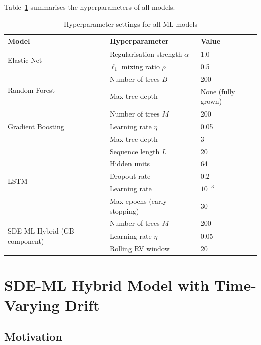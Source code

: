 \documentclass[12pt, a4paper, oneside]{report}
\theoremstyle{plain}
\theoremstyle{definition}
\theoremstyle{remark}
\begin{document}
Table~\ref{tab:hyperparams} summarises the hyperparameters of all models.

\begin{table}[H]
\begin{singlespace}
\fontsize{10}{11}\selectfont
\caption{Hyperparameter settings for all ML models}
\label{tab:hyperparams}
\begin{tabular}{@{}lll@{}}
\toprule
Model & Hyperparameter & Value \\
\midrule
\multirow{2}{*}{Elastic Net}
  & Regularisation strength $\alpha$ & 1.0 \\
  & $\ell_1$ mixing ratio $\rho$ & 0.5 \\[4pt]
\multirow{2}{*}{Random Forest}
  & Number of trees $B$ & 200 \\
  & Max tree depth & None (fully grown) \\[4pt]
\multirow{3}{*}{Gradient Boosting}
  & Number of trees $M$ & 200 \\
  & Learning rate $\eta$ & 0.05 \\
  & Max tree depth & 3 \\[4pt]
\multirow{5}{*}{LSTM}
  & Sequence length $L$ & 20 \\
  & Hidden units & 64 \\
  & Dropout rate & 0.2 \\
  & Learning rate & $10^{-3}$ \\
  & Max epochs (early stopping) & 30 \\[4pt]
\multirow{3}{*}{SDE-ML Hybrid (GB component)}
  & Number of trees $M$ & 200 \\
  & Learning rate $\eta$ & 0.05 \\
  & Rolling RV window & 20 \\
\bottomrule
\end{tabular}
\end{singlespace}
\end{table}

\section{SDE-ML Hybrid Model with Time-Varying Drift}
\label{sec:hybrid}

\subsection{Motivation}
\end{document}
